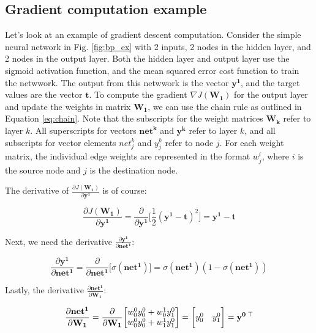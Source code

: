 \documentclass{article}
\begin{document}
\subsection{Gradient computation example}

Let's look at an example of gradient descent computation. Consider the simple neural network in Fig. \ref{fig:bp_ex} with 2 inputs, 2 nodes in the hidden layer, and 2 nodes in the output layer. Both the hidden layer and output layer use the sigmoid activation function, and the mean squared error cost function to train the netwwork. The output from this netwwork is the vector $\mathbf{y^1}$, and the target values are the vector $\mathbf{t}$. To compute the gradient $\nabla J(\mathbf{W_1})$ for the output layer and update the weights in matrix $\mathbf{W_1}$, we can use the chain rule as outlined in Equation \ref{eq:chain}. Note that the subscripts for the weight matrices $\mathbf{W_k}$ refer to layer $k$. All superscripts for vectors $\mathbf{net^k}$ and $\mathbf{y^k}$ refer to layer $k$, and all subscripts for vector elements $net^k_j$ and $y^k_j$ refer to node $j$. For each weight matrix, the individual edge weights are represented in the format $w^i_j$, where $i$ is the source node and $j$ is the destination node.



The derivative of $\frac{\partial J(\mathbf{W_1})}{\partial \mathbf{y^1}}$ is of course:

\begin{equation}
\label{}
   \frac{\partial J(\mathbf{W_1})}{\partial \mathbf{y^1}} = \frac{\partial}{\partial \mathbf{y^1}}\bigg[\frac{1}{2}(\mathbf{y^1} - \mathbf{t})^2\bigg] = \mathbf{y^1} - \mathbf{t}
\end{equation}

Next, we need the derivative $\frac{\partial \mathbf{y^1}}{\partial \mathbf{\mathbf{net}}\mathbf{^1}}$:

\begin{equation}
\label{}
   \frac{\partial \mathbf{y^1}}{\partial \mathbf{net}\mathbf{^1}} = \frac{\partial}{\partial \mathbf{net}\mathbf{^1}}\bigg[\sigma(\mathbf{net}\mathbf{^1})\bigg] = \sigma(\mathbf{net}\mathbf{^1})(1 - \sigma(\mathbf{net}\mathbf{^1}))
\end{equation}

Lastly, the derivative $\frac{\partial \mathbf{net}\mathbf{^1}}{\partial \mathbf{W_1}}$:

\begin{equation}
\label{}
   \frac{\partial \mathbf{net}\mathbf{^1}}{\partial \mathbf{W_1}} = \frac{\partial}{\partial \mathbf{W_1}}\bigg[ 
   \begin{matrix} w_0^0y_0^0 + w_0^1y_1^0 \\ w_0^0y_0^0 + w_1^1y_1^0 \end{matrix} 
   \bigg] = \bigg[\begin{matrix} y_0^0 & y_1^0 \end{matrix}\bigg] = \mathbf{y^0} \thinspace ^\top
\end{equation}
\end{document}
